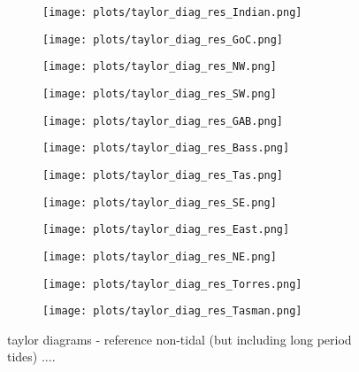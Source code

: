 \documentclass[jmse,article,submit,moreauthors,pdftex,10pt,a4paper]{mdpi}
\begin{document}
\begin{figure}[H]
\centering
    \begin{subfigure}[a]{0.29\textwidth}
        \texttt{[image: plots/taylor\_diag\_res\_Indian.png]}
    \end{subfigure}
    \begin{subfigure}[a]{0.29\textwidth}
        \texttt{[image: plots/taylor\_diag\_res\_GoC.png]}
    \end{subfigure}
    \begin{subfigure}[a]{0.29\textwidth}
        \texttt{[image: plots/taylor\_diag\_res\_NW.png]}
    \end{subfigure}
    \begin{subfigure}[a]{0.29\textwidth}
        \texttt{[image: plots/taylor\_diag\_res\_SW.png]}
    \end{subfigure}
    \begin{subfigure}[a]{0.29\textwidth}
        \texttt{[image: plots/taylor\_diag\_res\_GAB.png]}
    \end{subfigure}
    \begin{subfigure}[a]{0.29\textwidth}
        \texttt{[image: plots/taylor\_diag\_res\_Bass.png]}
    \end{subfigure}
    \begin{subfigure}[a]{0.29\textwidth}
        \texttt{[image: plots/taylor\_diag\_res\_Tas.png]}
    \end{subfigure}
    \begin{subfigure}[a]{0.29\textwidth}
        \texttt{[image: plots/taylor\_diag\_res\_SE.png]}
    \end{subfigure}
    \begin{subfigure}[a]{0.29\textwidth}
        \texttt{[image: plots/taylor\_diag\_res\_East.png]}
    \end{subfigure}
    \begin{subfigure}[a]{0.29\textwidth}
        \texttt{[image: plots/taylor\_diag\_res\_NE.png]}
    \end{subfigure}
    \begin{subfigure}[a]{0.29\textwidth}
        \texttt{[image: plots/taylor\_diag\_res\_Torres.png]}
    \end{subfigure}
    \begin{subfigure}[a]{0.29\textwidth}
        \texttt{[image: plots/taylor\_diag\_res\_Tasman.png]}
    \end{subfigure}
    \caption{ taylor diagrams - reference non-tidal (but including long period tides) ....}
\end{figure}   
\end{document}
